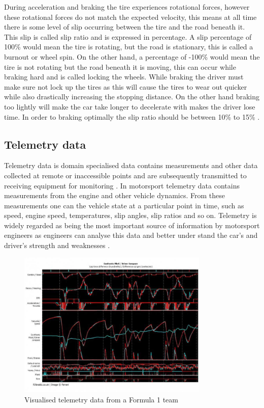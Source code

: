 During acceleration and braking the tire experiences rotational forces, however these rotational forces do not match the expected velocity, this means at all time there is some level of slip occurring between the tire and the road beneath it. This slip is called slip ratio and is expressed in percentage. A slip percentage of 100\% would mean the tire is rotating, but the road is stationary, this is called a burnout or wheel spin. On the other hand, a percentage of -100\% would mean the tire is not rotating but the road beneath it is moving, this can occur while braking hard and is called locking the wheels\cite{pacejka2006tire}. While braking the driver must make sure not lock up the tires as this will cause the tires to wear out quicker while also drastically increasing the stopping distance. On the other hand braking too lightly will make the car take longer to decelerate with makes the driver lose time. In order to braking optimally the slip ratio should be between 10\% to 15\% \cite{GoingFaster}.

\subsection{Telemetry data}
Telemetry data is domain specialised data contains measurements and other data collected at remote or inaccessible points and are subsequently transmitted to receiving equipment for monitoring \cite{nasaTelemetry}. In motorsport telemetry data contains measurements from the engine and other vehicle dynamics. From these measurements one can the vehicle state at a particular point in time, such as speed, engine speed, temperatures, slip angles, slip ratios and so on. Telemetry is widely regarded as being the most important source of information by motorsport engineers as engineers can analyse this data and better under stand the car's and driver's strength and weaknesses \cite{CarDataAnalysis}.

\begin{figure}[!htb]
	\centering
	\includegraphics[height=7cm]{charts/telemetrydata.jpg}
	\caption{Visualised telemetry data from a Formula 1 team}
	\label{fig:telemetrydata}
\end{figure}

